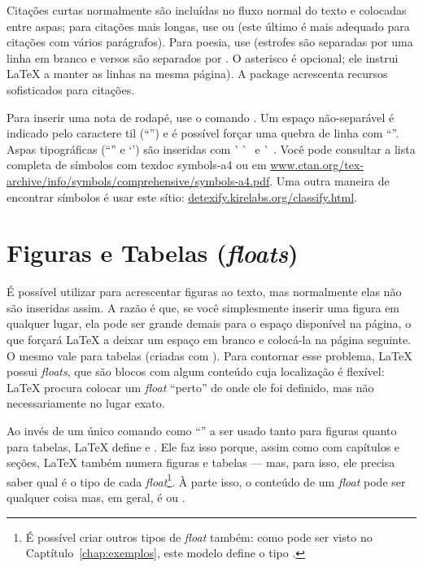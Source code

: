 Citações curtas normalmente são incluídas no fluxo normal do texto e colocadas
entre aspas; para citações mais longas, use  ou
 (este último é mais adequado para citações com
vários parágrafos). Para poesia, use  (estrofes são separadas por
uma linha em branco e versos são separados por \cmd{\sla\sla{}*}. O asterisco
é opcional; ele instrui \LaTeX{} a manter as linhas na mesma página). A package
 acrescenta recursos sofisticados para citações.

Para inserir uma nota de rodapé, use o comando
. Um espaço
não-separável é indicado pelo caractere til (``\cmd{\textasciitilde{}}'')
e é possível forçar uma quebra de linha com ``\cmd{\sla\sla{}}''. Aspas
tipográficas (``\;'' e `\;') são inseridas com
\`\space\,\`\space\space\,\textquotesingle\,\textquotesingle{} e
\`\space\,\,\textquotesingle. Você pode consultar a lista completa de
símbolos com \textsf{texdoc symbols-a4} ou em \url{www.ctan.org/tex-archive/info/symbols/comprehensive/symbols-a4.pdf}.
Uma outra maneira de encontrar símbolos é usar este sítio: \url{detexify.kirelabs.org/classify.html}.

\section{Figuras e Tabelas (\emph{floats})}
\label{sec:floats}

É possível utilizar  para acrescentar figuras
ao texto, mas normalmente elas não são inseridas assim. A razão é que,
se você simplesmente inserir uma figura em qualquer lugar, ela pode
ser grande demais para o espaço disponível na página, o que forçará
\LaTeX{} a deixar um espaço em branco e colocá-la na página seguinte.
O mesmo vale para tabelas (criadas com ).
Para contornar esse problema, \LaTeX{} possui \emph{floats}, que
são blocos com algum conteúdo cuja localização é flexível: \LaTeX{}
procura colocar um \emph{float} ``perto'' de onde ele foi definido,
mas não necessariamente no lugar exato.

Ao invés de um único comando como ``'' a
ser usado tanto para figuras quanto para tabelas, \LaTeX{} define
 e . Ele faz isso
porque, assim como com capítulos e seções, \LaTeX{} também numera
figuras e tabelas --- mas, para isso, ele precisa saber qual é o tipo de
cada \emph{float}\footnote{É possível criar outros tipos de \emph{float}
também: como pode ser visto no Captítulo~\ref{chap:exemplos}, este
modelo define o tipo .}. À parte isso, o conteúdo de
um \emph{float} pode ser qualquer coisa mas, em geral, é
 ou .

